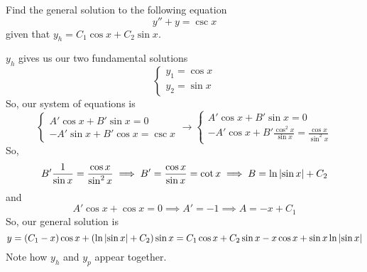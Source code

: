 \begin{example}
	Find the general solution to the following equation
	\begin{equation*}
		y'' + y = \csc{x}
	\end{equation*}
	given that $y_h = C_1\cos{x} + C_2\sin{x}$.
\end{example}
\noindent
$y_h$ gives us our two fundamental solutions
\begin{equation*}
	\begin{cases}
		y_1 = \cos{x} \\
		y_2 = \sin{x}
	\end{cases}
\end{equation*}
So, our system of equations is
\begin{equation*}
	\begin{cases}
		A'\cos{x} + B'\sin{x} = 0 \\
		-A'\sin{x} + B'\cos{x} = \csc{x}
	\end{cases} \to \begin{cases}
		A'\cos{x} + B'\sin{x} = 0 \\
		-A'\cos{x} + B'\frac{\cos^{2}{x}}{\sin{x}} = \frac{\cos{x}}{\sin^{2}{x}}
	\end{cases}
\end{equation*}
So, 
\begin{equation*}
	B'\frac{1}{\sin{x}} = \frac{\cos{x}}{\sin^{2}{x}} \implies B' = \frac{\cos{x}}{\sin{x}} = \cot{x} \implies B = \ln{\lvert \sin{x} \rvert} + C_2
\end{equation*}
and
\begin{equation*}
	A'\cos{x} + \cos{x} = 0 \implies A' = -1 \implies A = -x + C_1
\end{equation*}
So, our general solution is
\begin{equation*}
	y = \left(C_1 - x\right)\cos{x} + \left(\ln{\lvert \sin{x} \rvert} + C_2\right)\sin{x} = C_1\cos{x} + C_2\sin{x} - x\cos{x} + \sin{x}\ln{\lvert \sin{x} \rvert}
\end{equation*}
Note how $y_h$ and $y_p$ appear together.